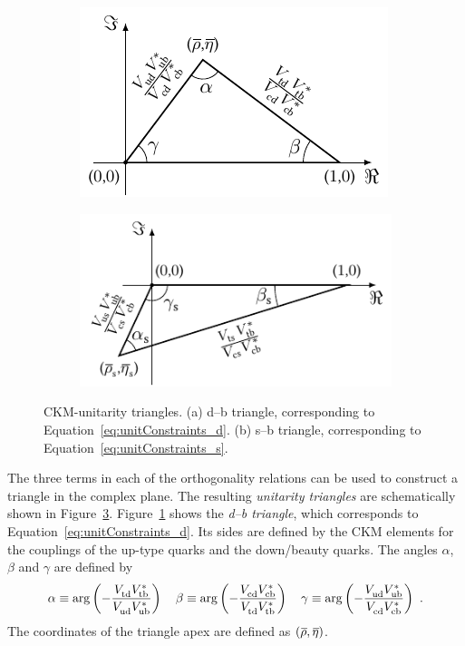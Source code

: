 \begin{figure}[tb]
  \centering
  \begin{subfigure}{0.475\textwidth}
    \raggedright
    \includegraphics{graphics/intro/tikz/b-d-triangle}
    \caption{}
    \label{fig:unitTriangles_bd}
  \end{subfigure}%
  \begin{subfigure}{0.525\textwidth}
    \raggedleft
    \includegraphics{graphics/intro/tikz/b-s-triangle}
    \caption{}
    \label{fig:unitTriangles_bs}
  \end{subfigure}
  \caption{CKM-unitarity triangles. (a) d--b triangle, corresponding to Equation~\ref{eq:unitConstraints_d}. (b) s--b triangle,
           corresponding to Equation~\ref{eq:unitConstraints_s}.}
  \label{fig:unitTriangles}
\end{figure}

The three terms in each of the orthogonality relations can be used to construct a triangle in the complex plane. The resulting
\emph{unitarity triangles} are schematically shown in Figure~\ref{fig:unitTriangles}. Figure~\ref{fig:unitTriangles_bd} shows the
\emph{d--b triangle}, which corresponds to Equation~\ref{eq:unitConstraints_d}. Its sides are defined by the CKM elements for the couplings
of the up-type quarks and the down/beauty quarks. The angles $\alpha$, $\beta$ and $\gamma$ are defined by
\begin{equation}
  \label{eq:bdAnglesDef}
  \alpha \equiv \arg\left( -\frac{\Vtd\Vtb[*]}{\Vud\Vub[*]} \right)
  \quad
  \beta  \equiv \arg\left( -\frac{\Vcd\Vcb[*]}{\Vtd\Vtb[*]} \right)
  \quad
  \gamma \equiv \arg\left( -\frac{\Vud\Vub[*]}{\Vcd\Vcb[*]} \right)
  \ .
\end{equation}
The coordinates of the triangle apex are defined as $(\rhobar, \etabar)$.

